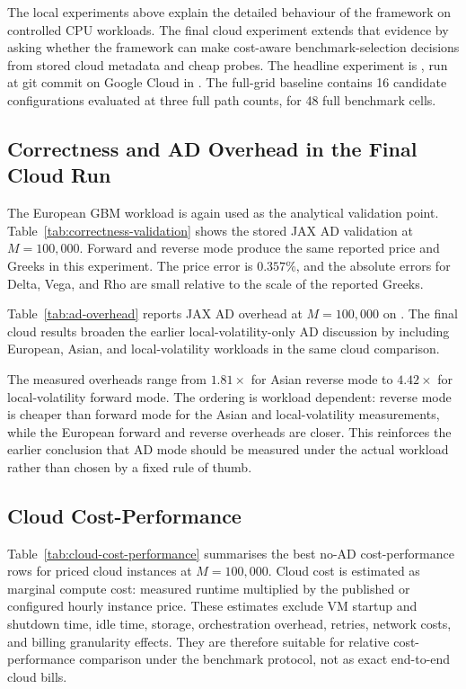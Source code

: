 The local experiments above explain the detailed behaviour of the framework on
controlled CPU workloads. The final cloud experiment extends that evidence by
asking whether the framework can make cost-aware benchmark-selection decisions
from stored cloud metadata and cheap probes. The headline experiment is
, run at git commit  on Google
Cloud  in . The full-grid baseline
contains 16 candidate configurations evaluated at three full path counts, for
48 full benchmark cells.

\subsection{Correctness and AD Overhead in the Final Cloud Run}
\label{subsec:cloud-correctness-ad}

The European GBM workload is again used as the analytical validation point.
Table~\ref{tab:correctness-validation} shows the stored JAX AD validation at
\(M=100{,}000\). Forward and reverse mode produce the same reported price and
Greeks in this experiment. The price error is \(0.357\%\), and the absolute
errors for Delta, Vega, and Rho are small relative to the scale of the
reported Greeks.



Table~\ref{tab:ad-overhead} reports JAX AD overhead at \(M=100{,}000\) on
. The final cloud results broaden the earlier
local-volatility-only AD discussion by including European, Asian, and
local-volatility workloads in the same cloud comparison.



The measured overheads range from \(1.81\times\) for Asian reverse mode to
\(4.42\times\) for local-volatility forward mode. The ordering is workload
dependent: reverse mode is cheaper than forward mode for the Asian and
local-volatility measurements, while the European forward and reverse overheads
are closer. This reinforces the earlier conclusion that AD mode should be
measured under the actual workload rather than chosen by a fixed rule of
thumb.

\subsection{Cloud Cost-Performance}
\label{subsec:cloud-cost-performance}

Table~\ref{tab:cloud-cost-performance} summarises the best no-AD
cost-performance rows for priced cloud instances at \(M=100{,}000\). Cloud
cost is estimated as marginal compute cost: measured runtime multiplied by the
published or configured hourly instance price. These estimates exclude VM
startup and shutdown time, idle time, storage, orchestration overhead, retries,
network costs, and billing granularity effects. They are therefore suitable for
relative cost-performance comparison under the benchmark protocol, not as exact
end-to-end cloud bills.

